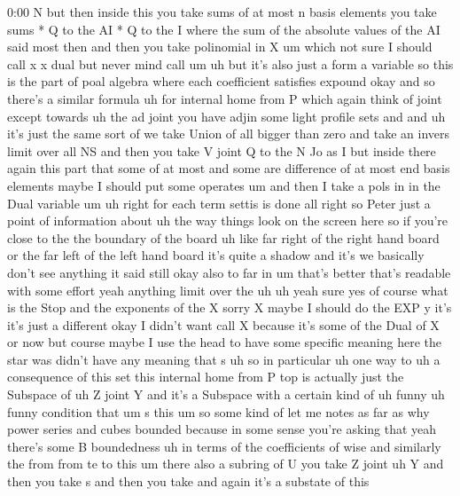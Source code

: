 \begin{unfinished}{0:00}
N  but  then  inside  this  you  take  sums  of
at  most  n  basis
elements  you  take  sums  *  Q  to  the  AI  *  Q
to  the  I  where  the  sum  of  the  absolute
values  of  the  AI  said  most
then  and  then  you  take  polinomial  in
X
um
which  not  sure  I  should  call  x  x  dual
but  never  mind
call
um  uh  but  it's  also  just  a  form  a
variable  so  this  is  the  part  of  poal
algebra  where  each  coefficient  satisfies
expound
okay  and  so  there's  a  similar
formula  uh
for  internal  home  from  P  which  again
think  of  joint
except
towards
uh  the  ad  joint  you
have
adjin
some  light  profile
sets  and  and  uh  it's  just  the  same  sort
of  we  take  Union  of  all  bigger  than
zero  and  take  an  invers  limit  over  all
NS  and  then  you  take  V  joint
Q  to  the
N  Jo  as
I  but  inside  there  again  this  part  that
some  of  at  most  and  some  are  difference
of  at  most  end  basis
elements
maybe  I  should  put  some
operates
um  and  then  I  take  a  pols  in  in  the  Dual
variable
um  uh  right  for  each  term  settis  is
done  all  right  so  Peter  just  a  point  of
information  about  uh  the  way  things  look
on  the  screen  here  so  if  you're  close  to
the  the  boundary  of  the  board  uh  like
far  right  of  the  right  hand  board  or  the
far  left  of  the  left  hand  board  it's
quite  a  shadow  and  it's  we  basically
don't  see
anything  it  said  still  okay  also  to  far
in  um  that's  better  that's  readable  with
some  effort
yeah  anything  limit  over  the  uh  uh  yeah
sure  yes  of
course  what  is  the  Stop  and  the
exponents  of  the
X  sorry  X  maybe  I  should  do  the  EXP  y
it's  it's  just  a  different
okay  I  didn't  want  call  X  because  it's
some  of  the  Dual  of  X
or
now  but  course  maybe  I  use  the  head  to
have  some  specific  meaning  here  the  star
was  didn't  have  any  meaning  that
s
uh  so  in
particular  uh  one  way  to  uh  a
consequence  of  this  set  this  internal
home  from  P
top  is  actually  just  the  Subspace
of
uh  Z  joint
Y  and  it's  a  Subspace  with  a  certain
kind  of  uh
funny  uh  funny  condition
that
um  s  this  um  so  some  kind  of  let  me
notes  as  far  as
why  power  series  and  cubes  bounded
because  in  some  sense  you're  asking
that  yeah  there's  some  B  boundedness  uh
in  terms  of  the  coefficients
of  wise  and  similarly
the
from  from  te  to  this
um  there  also  a  subring  of  U  you  take  Z
joint  uh  Y  and  then  you  take  s  and  then
you
take  and  again  it's  a  substate  of  this

\end{unfinished}
